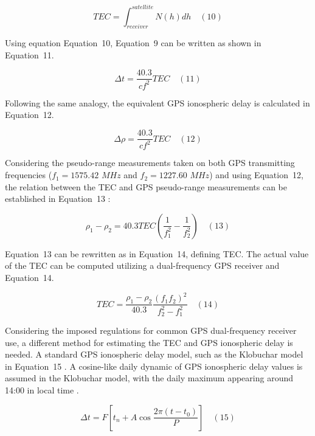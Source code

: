 \documentclass[sn-mathphys-num]{sn-jnl}%
\begin{document}
\begin{equation}
	TEC = \int_{receiver}^{satellite} N(h)dh
	\quad\left(10\right)
\end{equation}

Using equation Equation~10, Equation~9 can be written as shown in Equation~11.

\begin{equation}
	\Delta t = \frac{40.3}{c f^{2}} TEC
	\quad\left(11\right)
\end{equation}

Following the same analogy, the equivalent GPS ionospheric delay is calculated in Equation~12.

\begin{equation}
	\Delta \rho = \frac{40.3}{c f^{2}} TEC
	\quad\left(12\right)
\end{equation}

Considering the pseudo-range measurements taken on both GPS transmitting frequencies ($f_{1}=1575.42$ $MHz$ and $f_{2}=1227.60$ $MHz$) and using Equation~12, the relation between the TEC and GPS pseudo-range measurements can be established in Equation~13 \cite{spilker1996global}:
 
\begin{equation}
	\rho_{1} - \rho_{2} = 40.3 TEC \left( \frac{1}{f_{1}^{2}} - \frac{1}{f_{2}^{2}} \right)
	\quad\left(13\right)
\end{equation}

Equation~13 can be rewritten as in Equation~14, defining TEC. The actual value of the TEC can be computed utilizing a dual-frequency GPS receiver and Equation~14.

\begin{equation}
	TEC = \frac{\rho_{1} - \rho_{2}}{40.3} \frac{{\left(f_{1}f_{2}\right)}^{2}}{f_{2}^{2}-f_{1}^{2}}
	\quad\left(14\right)
\end{equation}

Considering the imposed regulations for common GPS dual-frequency receiver use, a different method for estimating the TEC and GPS ionospheric delay is needed. A standard GPS ionospheric delay model, such as the Klobuchar model in Equation~15 \cite{enge1994global,spilker1996global}. A cosine-like daily dynamic of GPS ionospheric delay values is assumed in the Klobuchar model, with the daily maximum appearing around 14:00 in local time \cite{klobuchar1987ionospheric}.

\begin{equation}
	\Delta t = F \left[ t_{n} + A \cos \frac{2\pi\left(t-t_{0}\right)}{P} \right]
	\quad\left(15\right)
\end{equation}
\end{document}
